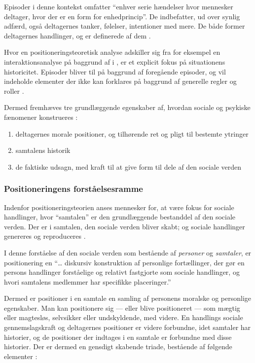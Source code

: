 Episoder i denne kontekst omfatter “enhver serie hændelser hvor 
mennesker deltager, hvor der er en form for enhedprincip”. De 
indbefatter, ud over synlig adfærd, også deltagernes tanker, 
følelser, intentioner med mere. De både former deltagernes 
handlinger, og er definerede af dem \autocite[s. 
5]{harrePositioningTheoryMoral1999}.

Hvor en positioneringsteoretisk analyse adskiller sig fra for 
eksempel en interaktionsanalyse på baggrund af 
\citeauthor{goffmanPresentationSelfEveryday1956} i
, er et explicit 
fokus på situationens historicitet. Episoder bliver til på 
baggrund af foregående episoder, og vil indeholde elementer der 
ikke kan forklares på baggrund af generelle regler og roller 
\autocite[s. 5-6]{harrePositioningTheoryMoral1999}.

Dermed fremhæves tre grundlæggende egenskaber af, hvordan sociale 
og psykiske fænomener konstrueres 
\autocite{harrePositioningTheoryMoral1999}:
\begin{enumerate}
  \item
    deltagernes morale positioner, og tilhørende ret og pligt 
    til bestemte ytringer
  \item
    samtalens historik
  \item
    de faktiske udsagn, med kraft til at give form til dele af 
    den sociale verden
\end{enumerate}

\subsubsection{Positioneringens forståelsesramme}

Indenfor positioneringsteorien anses mennesker for, at være fokus 
for sociale handlinger, hvor “samtalen” er den grundlæggende 
bestanddel af den sociale verden. Der er i samtalen,
den sociale verden bliver skabt; og sociale handlinger genereres 
og reproduceres \autocite[s. 
15]{harrePositioningTheoryMoral1999}.

I denne forståelse af den sociale verden som bestående af 
\emph{personer} og \emph{samtaler}, er positionering en “\ldots 
diskursiv konstruktion af personlige fortællinger, der gør en 
persons handlinger forståelige og relativt fastgjorte som sociale 
handlinger, og hvori samtalens medlemmer har specifikke 
placeringer.” \autocite[s. 16]{harrePositioningTheoryMoral1999}

Dermed er positioner i en samtale en samling af personens moralske
og personlige egenskaber. Man kan positionere sig — eller blive 
positioneret — som mægtig eller magtesløs, selvsikker eller 
undskyldende, med videre. En handlings sociale gennemslagskraft og
deltagernes positioner er videre forbundne, idet samtaler har 
historier, og de positioner der indtages i en samtale er forbundne
med disse historier. Der er dermed en gensdigt skabende triade, 
bestående af følgende elementer \autocite[s.  
17-18]{harrePositioningTheoryMoral1999}:

